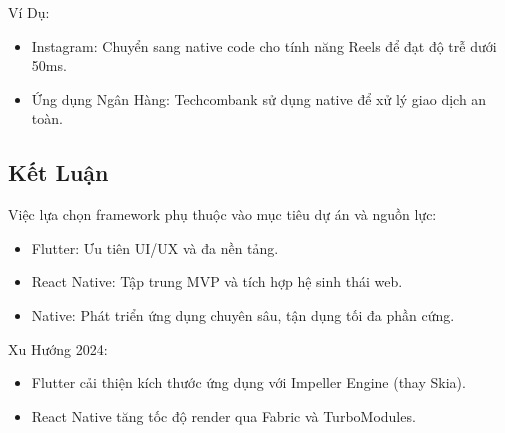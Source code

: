     \begin{flushleft}
      \hspace*{0.8cm}Ví Dụ:
      \setlength{\leftmargini}{1.5cm}
      \begin{itemize}
          \item Instagram: Chuyển sang native code cho tính năng Reels để đạt độ trễ dưới 50ms.
          \item Ứng dụng Ngân Hàng: Techcombank sử dụng native để xử lý giao dịch an toàn.
      \end{itemize}
    \end{flushleft}

\subsection{Kết Luận}
\renewcommand{\labelitemi}{--}    
\begin{flushleft}
  \hspace*{0.8cm}Việc lựa chọn framework phụ thuộc vào mục tiêu dự án và nguồn lực:
  \setlength{\leftmargini}{1.5cm}
  \begin{itemize}
      \item Flutter: Ưu tiên UI/UX và đa nền tảng.
      \item React Native: Tập trung MVP và tích hợp hệ sinh thái web.
      \item Native: Phát triển ứng dụng chuyên sâu, tận dụng tối đa phần cứng.
  \end{itemize}
\end{flushleft}

\begin{flushleft}
  \hspace*{0.8cm}Xu Hướng 2024:
  \setlength{\leftmargini}{1.5cm}
  \begin{itemize}
      \item Flutter cải thiện kích thước ứng dụng với Impeller Engine (thay Skia).
      \item React Native tăng tốc độ render qua Fabric và TurboModules.
  \end{itemize}
\end{flushleft}